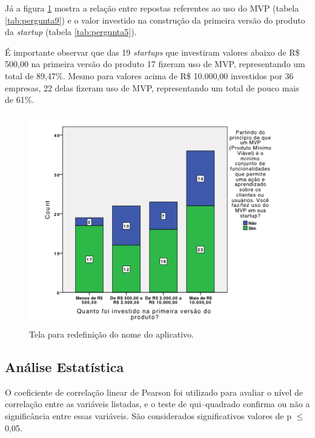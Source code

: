 \pagebreak

J\'a a figura \ref{fig:cap4fig2} mostra a rela\c{c}\~ao entre repostas referentes ao uso do MVP (tabela \ref{tab:pergunta9}) e o valor investido na constru\c{c}\~ao da primeira vers\~ao do produto da \emph{startup} (tabela \ref{tab:pergunta5}). 

\'E importante observar que das 19 \emph{startups} que investiram valores abaixo de R\$ 500,00 na primeira vers\~ao do produto 17 fizeram uso de MVP, representando um total de 89,47\%. Mesmo para valores acima de R\$ 10.000,00 investidos por 36 empresas, 22 delas fizeram uso de MVP, representando um total de pouco mais de 61\%.

\begin{figure}[h]
  \centering
  \includegraphics[width=1.1\textwidth]{./fig/graph2}
  \caption{Tela para redefini\c{c}\~ao do nome do aplicativo.}
  \label{fig:cap4fig2}
\end{figure}

\pagebreak

\subsection{An\'alise Estat\'istica}

O coeficiente de correla\c{c}\~ao linear de Pearson foi utilizado para avaliar o n\'ivel de correla\c{c}\~ao entre as vari\'aveis listadas, e o teste de qui--quadrado confirma ou n\~ao a signific\^ancia entre essas vari\'aveis. S\~ao considerados significativos valores de p $\leq$ 0,05.

